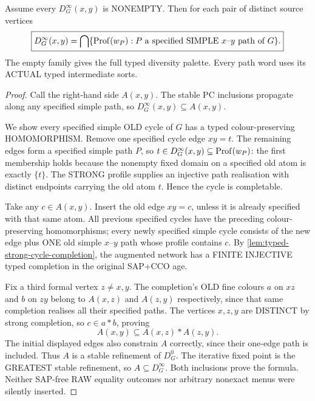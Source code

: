 \begin{lemma}
\label{lem:typed-PC-walk-formula}
Assume every $D^\infty_G(x,y)$ is NONEMPTY.
Then for each pair of distinct source vertices
\[
 \boxed{D^\infty_G(x,y)=
  \bigcap\{\operatorname{Prof}(w_P):P\text{ a specified SIMPLE
   }x\text{--}y\text{ path of }G\}.}
\]
The empty family gives the full typed diversity palette.
Every path word uses its ACTUAL typed intermediate sorts.
\end{lemma}
\begin{proof}
Call the right-hand side $A(x,y)$. The stable PC
inclusions propagate along any specified simple path,
so $D^\infty_G(x,y)\subseteq A(x,y)$.

We show every specified simple OLD cycle of $G$
has a typed colour-preserving HOMOMORPHISM.
Remove one specified cycle edge $xy=t$.
The remaining edges form a specified simple path
$P$, so $t\in D^\infty_G(x,y)\subseteq\operatorname{Prof}(w_P)$:
the first membership holds because the nonempty
fixed domain on a specified old atom is exactly
$\{t\}$. The STRONG profile supplies an injective
path realisation with distinct endpoints carrying
the old atom $t$. Hence the cycle is completable.

Take any $c\in A(x,y)$. Insert the old edge
$xy=c$, unless it is already specified with that
same atom. All previous specified cycles have
the preceding colour-preserving homomorphisms;
every newly specified simple cycle consists
of the new edge plus ONE old simple $x$--$y$
path whose profile contains $c$. By
\cref{lem:typed-strong-cycle-completion},
the augmented network has a FINITE INJECTIVE
typed completion in the original SAP+CCO age.

Fix a third formal vertex $z\ne x,y$.
The completion's OLD fine colours $a$ on
$xz$ and $b$ on $zy$ belong to $A(x,z)$
and $A(z,y)$ respectively, since that same
completion realises all their specified paths.
The vertices $x,z,y$ are DISTINCT by strong
completion, so $c\in a*b$, proving
\[
 A(x,y)\subseteq A(x,z)*A(z,y).
\]
The initial displayed edges also constrain $A$
correctly, since their one-edge path is included.
Thus $A$ is a stable refinement of $D^0_G$.
The iterative fixed point is the GREATEST stable
refinement, so $A\subseteq D^\infty_G$.
Both inclusions prove the formula. Neither SAP-free
RAW equality outcomes nor arbitrary nonexact menus
were silently inserted.
\end{proof}

